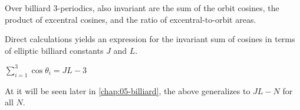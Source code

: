 \begin{corollary}
Over billiard 3-periodics, also invariant are the sum of the orbit cosines, the product of excentral cosines, and the ratio of excentral-to-orbit areas.
\label{cor:03-rOvR}
\end{corollary}

Direct calculations yields an expression for the invariant sum of cosines in terms of elliptic billiard constants $J$ and $L$.

\begin{corollary}
$\sum_{i=1}^{3}{\cos\theta_i}=J L - 3$
\end{corollary}

At it will be seen later in \cref{chap:05-billiard}, the above generalizes to $J L -N$ for all $N$.